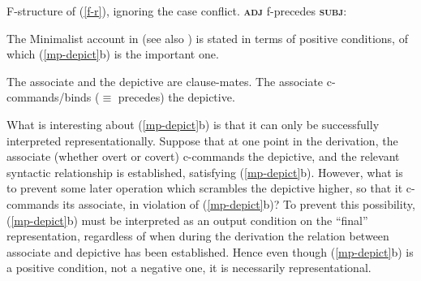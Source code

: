 \documentclass[output=paper,hidelinks]{langscibook}
\begin{document}
\vbox{%
\ea\label{fs-f-r}
F-structure of (\ref{f-r}), ignoring the case
  conflict. \textbf{\textsc{adj}} f-precedes \textbf{\textsc{subj}}:\\ 
\z
}


The Minimalist account in \citet{polipots06} (see also
\citealp{fukuda08}) is stated in terms of positive conditions, of
which (\ref{mp-depict}b) is the important one.

\ea\label{mp-depict}\ea
The associate and the depictive are clause-mates.
\ex
The associate c-commands/binds ($\equiv$ precedes) the depictive.
\z\z

What is interesting about (\ref{mp-depict}b) is that it can only be successfully
interpreted representationally. Suppose that at one point in the
derivation, the associate (whether overt or covert) c-commands the
depictive, and the relevant syntactic relationship is established,
satisfying (\ref{mp-depict}b). However, what is to prevent some later operation
which scrambles the depictive higher, so that it c-commands its
associate, in violation of (\ref{mp-depict}b)? To prevent this possibility,
(\ref{mp-depict}b) must be interpreted as an output condition on the ``final''
representation, regardless of when during the derivation the relation
between associate and depictive has been established. Hence even
though (\ref{mp-depict}b) is a positive condition, not a negative one, it is
necessarily representational.
\end{document}
